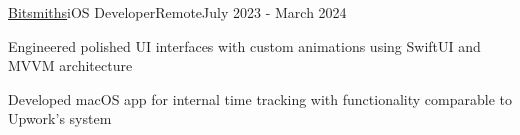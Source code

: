 \begin{resume_employer}{\href{http://bitsmiths.io}{Bitsmiths}}{iOS Developer}{Remote}{July 2023 - March 2024}




\item Engineered polished UI interfaces with custom animations using SwiftUI and MVVM architecture
\item Developed macOS app for internal time tracking with functionality comparable to Upwork's system
\end{resume_employer}

  
